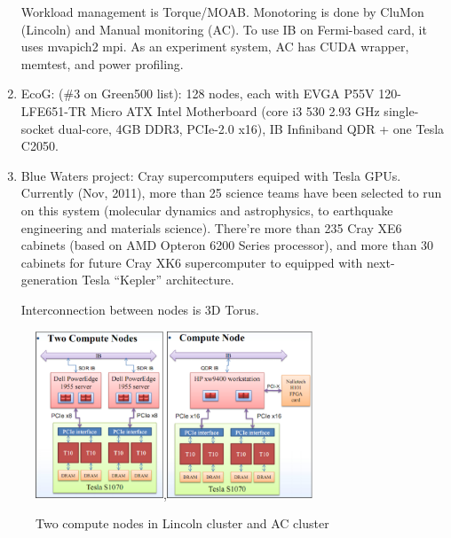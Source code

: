 \begin{enumerate}
\begin{framed}
Workload management is Torque/MOAB. Monotoring is done by CluMon (Lincoln) and
Manual monitoring (AC). To use IB on Fermi-based card, it uses mvapich2 mpi. As
an experiment system, AC has CUDA wrapper, memtest, and power profiling. 
\end{framed}  

  \item EcoG: (\#3 on Green500 list): 128 nodes, each with EVGA P55V
  120-LFE651-TR Micro ATX Intel Motherboard (core i3 530 2.93 GHz single-socket dual-core, 4GB DDR3, PCIe-2.0
x16), IB Infiniband QDR + one Tesla C2050. 

\item Blue Waters project: Cray supercomputers equiped with Tesla GPUs.
Currently (Nov, 2011), more than 25 science teams have been selected to run on
this system (molecular dynamics and astrophysics, to earthquake engineering and
materials science). There're more than 235 Cray XE6 cabinets (based on AMD
Opteron 6200 Series processor), and more than 30 cabinets for future Cray XK6
supercomputer to equipped with next-generation Tesla ``Kepler'' architecture.

Interconnection between nodes is 3D Torus. 
\end{enumerate}

\begin{figure}[hbt]
  \centerline{\includegraphics[height=5cm,
    angle=0]{./images/Lincoln_nodes1.eps},\includegraphics[height=5cm,
    angle=0]{./images/AC_nodes.eps}}
\caption{Two compute nodes in Lincoln cluster and AC cluster}
\label{fig:Lincoln_node.AC_node}
\end{figure}

